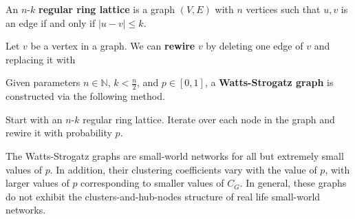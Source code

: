 \begin{definition}
  An $n$-$k$ \textbf{regular ring lattice} is a graph $(V, E)$ with $n$ vertices
  such that $u,v$ is an edge if and only if $|u-v| \leq k$.
\end{definition}

\begin{definition}
  Let $v$ be a vertex in a graph. We can \textbf{rewire} $v$ by deleting one
  edge of $v$ and replacing it with 
\end{definition}

\begin{definition}
  Given parameters $n \in \mathbb{N}$, $k < \frac{n}{2}$, and $p \in [0,1]$, a
  \textbf{Watts-Strogatz graph} is constructed via the following method.

  Start with an $n$-$k$ regular ring lattice. Iterate over each node in the
  graph and rewire it with probability $p$.
\end{definition}

The Watts-Strogatz graphs are small-world networks for all but extremely small
values of $p$. In addition, their clustering coefficients vary with the value of
$p$, with larger values of $p$ corresponding to smaller values of $C_G$. In
general, these graphs do not exhibit the clusters-and-hub-nodes structure of
real life small-world networks.